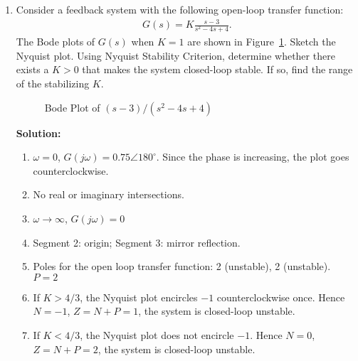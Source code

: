 \documentclass{article}
\newlength\figureheight
\newlength\figurewidth
\newcommand{\tikzdir}[1]{tikz/#1.tikz}
\newcommand{\inputtikz}[1]{}}
\begin{document}
\begin{enumerate}
  \newpage
\item Consider a feedback system with the following open-loop transfer function:
  \begin{align*}
    G(s) = K\frac{s-3}{s^2-4s+4}.
  \end{align*}
  The Bode plots of $G(s)$ when $K = 1$ are shown in Figure~\ref{fig:2}. Sketch the Nyquist plot. Using Nyquist Stability Criterion, determine whether there exists a $K > 0$ that makes the system closed-loop stable. If so, find the range of the stabilizing $K$.
  \begin{figure}[ht]
    \setlength\figureheight{5cm}
    \setlength\figurewidth{14cm}
    \centering
    \inputtikz{Quiz26}
    \caption{Bode Plot of $(s-3)/(s^2-4s+4)$\label{fig:2}}
  \end{figure}

  {\bf Solution:}
  \begin{enumerate}

  \item $\omega = 0$, $G(j\omega) = 0.75\angle 180^\circ$. Since the phase is increasing, the plot goes counterclockwise.
  \item No real or imaginary intersections.
  \item $\omega\rightarrow \infty$, $G(j\omega) = 0$
  \item Segment 2: origin; Segment 3: mirror reflection.
  \item Poles for the open loop transfer function: 2 (unstable), 2 (unstable). $P=2$
  \item  If $K > 4/3$, the Nyquist plot encircles $-1$ counterclockwise once. Hence $N = -1$, $Z = N+P = 1$, the system is closed-loop unstable.
  \item  If $K < 4/3$, the Nyquist plot does not encircle $-1$. Hence $N = 0$, $Z = N+P = 2$, the system is closed-loop unstable.
  \end{enumerate}

  \begin{figure}[h]
    \setlength{}
    \setlength\figurewidth{8cm}
    \centering
    \inputtikz{Quiz26Nyquist}
  \end{figure}

\end{enumerate}
\end{document}
